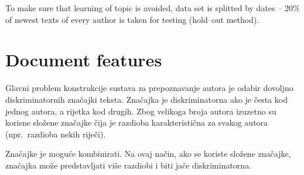 \documentclass[11pt,english]{article}
\begin{document}
\begin{multicols}{2}
To make sure that learning of topic is avoided, data set is splitted by dates
-- 20\% of newest texts of every author is taken for testing (hold--out method).


\begin{minipage}{0.8\linewidth}
\vspace{10pt}
\centerline{\resizebox{1.4\linewidth}{!}{}}%
%
\label{fig:articlesPerAuthor}
\end{minipage}

\begin{minipage}{0.8\linewidth}
\vspace{10pt}
\centerline{\resizebox{1.4\linewidth}{!}{}}%
%
\label{fig:wordsPerAuthor}
\end{minipage}

\begin{minipage}{0.8\linewidth}
\vspace{10pt}
\centerline{\resizebox{1.4\linewidth}{!}{}}%
%
\label{fig:avgWordsPerAuthorArticle}
\end{minipage}

\section{Document features}
Glavni problem konstrukcije sustava za prepoznavanje autora je odabir dovoljno
diskriminatornih značajki teksta. Značajka je diskriminatorna ako je česta kod
jednog autora, a rijetka kod drugih. Zbog velikoga broja autora izuzetno su
korisne složene značajke čija je razdioba karakteristična za svakog autora
(npr.~razdioba nekih riječi).

Značajke je moguće kombinirati. Na ovaj način, ako se koriste složene značajke,
značajka može predstavljati više razdiobi i biti jače diskriminatorna.


\end{multicols}
\end{document}
